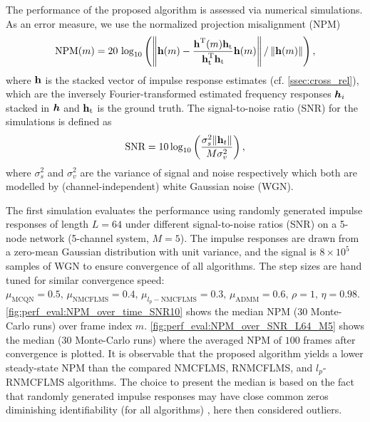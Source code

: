 \documentclass{article}
\begin{document}
The performance of the proposed algorithm is assessed via numerical simulations.
As an error measure, we use the normalized projection misalignment (NPM) \cite{huangClassFrequencydomainAdaptive2003}
\begin{equation}
    \text{NPM}(m) = 20\,\log_{10} \left(\left\| \bm{\mathrm{h}}(m) - \frac{\bm{\mathrm{h}}^{\mathrm{T}} (m) \bm{\mathrm{h}}_{\text{t}}}{\bm{\mathrm{h}}_{\text{t}}^{\mathrm{T}} \bm{\mathrm{h}}_{\text{t}}}\bm{\mathrm{h}}(m) \right\| / \left\|\bm{\mathrm{h}}(m)\right\| \right),
\end{equation}
where \(\bm{\mathrm{h}}\) is the stacked vector of impulse response estimates (cf. \autoref{ssec:cross_rel}), which are the inversely Fourier-transformed estimated frequency responses \({\bm{h}}_i\) stacked in \({\bm{h}}\) and \(\bm{\mathrm{h}}_{\text{t}}\) is the ground truth. The signal-to-noise ratio (SNR) for the simulations is defined as 
\begin{equation}
    \text{SNR} = 10 \log_{10} \left(\frac{\sigma_s^2 \| \bm{\mathrm{h}}_t \|}{M \sigma_v^2} \right),
\end{equation}
where \(\sigma_s^2\) and \(\sigma_v^2\) are the variance of signal and noise respectively which both are modelled by (channel-independent) white Gaussian noise (WGN).

The first simulation evaluates the performance using randomly generated impulse responses of length \(L=64\) under different signal-to-noise ratios (SNR) on a 5-node network (5-channel system, \(M=5\)).
The impulse responses are drawn from a zero-mean Gaussian distribution with unit variance, and the signal is \(8 \times 10^{5}\) samples of WGN to ensure convergence of all algorithms.
The step sizes are hand tuned for similar convergence speed: \(\mu_{\text{MCQN}}=0.5,\, \mu_{\text{NMCFLMS}}=0.4,\, \mu_{l_p-\text{NMCFLMS}}=0.3,\, \mu_{\text{ADMM}}=0.6,\, \rho=1,\,\eta=0.98 \).
\autoref{fig:perf_eval:NPM_over_time_SNR10} shows the median NPM (30 Monte-Carlo runs) over frame index \(m\).
\autoref{fig:perf_eval:NPM_over_SNR_L64_M5} shows the median (30 Monte-Carlo runs) where the averaged NPM of \(100\) frames after convergence is plotted.
It is observable that the proposed algorithm yields a lower steady-state NPM than the compared NMCFLMS, RNMCFLMS, and \(l_p\)-RNMCFLMS algorithms.
The choice to present the median is based on the fact that randomly generated impulse responses may have close common zeros diminishing identifiability (for all algorithms) \cite{naylorNearCommonZerosBlind2008}, here then considered outliers.
\end{document}
